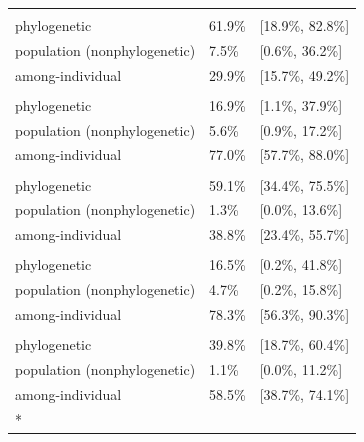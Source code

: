 \documentclass[
  letterpaper,
  DIV=11,
  numbers=noendperiod]{scrartcl}
\providecommand{\DIFaddend}{} %
\DeclareRobustCommand{\DIFaddend}{\DIFOaddend \let\includegraphics\DIFOincludegraphics} %
\begin{document}
\begin{longtable}{lll}
\endfoot
\bottomrule
\endlastfoot
\addlinespace[0.3em]
\multicolumn{3}{l}{\textbf{$\log \left( l_\mathrm{gc} \right)$}}\\
\hspace{1em}phylogenetic & 61.9\% & {}[18.9\%, 82.8\%]\\
\hspace{1em}population (nonphylogenetic) & 7.5\% & {}[0.6\%, 36.2\%]\\
\hspace{1em}among-individual & 29.9\% & {}[15.7\%, 49.2\%]\\
\addlinespace[0.3em]
\multicolumn{3}{l}{\textbf{$\log \left( g_\mathrm{i} \right)$}}\\
\hspace{1em}phylogenetic & 16.9\% & {}[1.1\%, 37.9\%]\\
\hspace{1em}population (nonphylogenetic) & 5.6\% & {}[0.9\%, 17.2\%]\\
\hspace{1em}among-individual & 77.0\% & {}[57.7\%, 88.0\%]\\
\addlinespace[0.3em]
\multicolumn{3}{l}{\textbf{$\log \left( g_\mathrm{max} \right)$}}\\
\hspace{1em}phylogenetic & 59.1\% & {}[34.4\%, 75.5\%]\\
\hspace{1em}population (nonphylogenetic) & 1.3\% & {}[0.0\%, 13.6\%]\\
\hspace{1em}among-individual & 38.8\% & {}[23.4\%, 55.7\%]\\
\addlinespace[0.3em]
\multicolumn{3}{l}{\textbf{$\log \left( \lambda \right)$}}\\
\hspace{1em}phylogenetic & 16.5\% & {}[0.2\%, 41.8\%]\\
\hspace{1em}population (nonphylogenetic) & 4.7\% & {}[0.2\%, 15.8\%]\\
\hspace{1em}among-individual & 78.3\% & {}[56.3\%, 90.3\%]\\
\addlinespace[0.3em]
\multicolumn{3}{l}{\textbf{$\log \left( \tau \right)$}}\\
\hspace{1em}phylogenetic & 39.8\% & {}[18.7\%, 60.4\%]\\
\hspace{1em}population (nonphylogenetic) & 1.1\% & {}[0.0\%, 11.2\%]\\
\hspace{1em}among-individual & 58.5\% & {}[38.7\%, 74.1\%]\\*

\end{longtable}
\DIFaddend 
\end{document}
